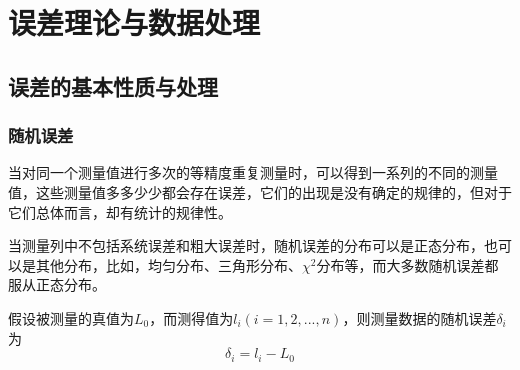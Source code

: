 \section{误差理论与数据处理}
\subsection{误差的基本性质与处理}
\subsubsection{随机误差}
当对同一个测量值进行多次的等精度重复测量时，可以得到一系列的不同的测量值，这些测量值多多少少都会存在误差，它们的出现是没有确定的规律的，但对于它们总体而言，却有统计的规律性。

当测量列中不包括系统误差和粗大误差时，随机误差的分布可以是正态分布，也可以是其他分布，比如，均匀分布、三角形分布、$ \chi^2 $分布等，而大多数随机误差都服从正态分布。

假设被测量的真值为$ L_0 $，而测得值为$ l_i(i=1,2,...,n) $，则测量数据的随机误差$ \delta_i $为\[ \delta_i=l_i-L_0 \]


